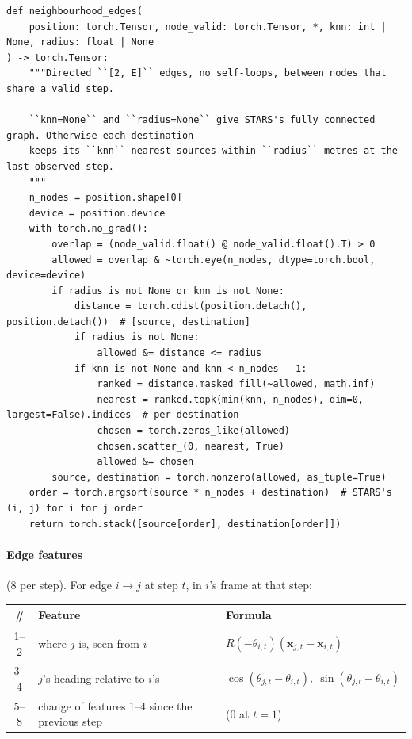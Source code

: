 \documentclass[10pt]{article}
\begin{document}
\par\smallskip{}\par\nopagebreak
\begin{lstlisting}[aboveskip=2pt]
def neighbourhood_edges(
    position: torch.Tensor, node_valid: torch.Tensor, *, knn: int | None, radius: float | None
) -> torch.Tensor:
    """Directed ``[2, E]`` edges, no self-loops, between nodes that share a valid step.

    ``knn=None`` and ``radius=None`` give STARS's fully connected graph. Otherwise each destination
    keeps its ``knn`` nearest sources within ``radius`` metres at the last observed step.
    """
    n_nodes = position.shape[0]
    device = position.device
    with torch.no_grad():
        overlap = (node_valid.float() @ node_valid.float().T) > 0
        allowed = overlap & ~torch.eye(n_nodes, dtype=torch.bool, device=device)
        if radius is not None or knn is not None:
            distance = torch.cdist(position.detach(), position.detach())  # [source, destination]
            if radius is not None:
                allowed &= distance <= radius
            if knn is not None and knn < n_nodes - 1:
                ranked = distance.masked_fill(~allowed, math.inf)
                nearest = ranked.topk(min(knn, n_nodes), dim=0, largest=False).indices  # per destination
                chosen = torch.zeros_like(allowed)
                chosen.scatter_(0, nearest, True)
                allowed &= chosen
        source, destination = torch.nonzero(allowed, as_tuple=True)
    order = torch.argsort(source * n_nodes + destination)  # STARS's (i, j) for i for j order
    return torch.stack([source[order], destination[order]])

\end{lstlisting}

\paragraph{Edge features} (8 per step). For edge $i\to j$ at step $t$, in $i$'s frame at that step:

\begin{center}\small
\begin{tabular}{@{}cll@{}}
\toprule
\# & Feature & Formula \\
\midrule
1--2 & where $j$ is, seen from $i$ & $R(-\theta_{i,t})(\mathbf x_{j,t}-\mathbf x_{i,t})$ \\
3--4 & $j$'s heading relative to $i$'s & $\cos(\theta_{j,t}-\theta_{i,t}),\ \sin(\theta_{j,t}-\theta_{i,t})$ \\
5--8 & change of features 1--4 since the previous step & (0 at $t=1$) \\
\bottomrule
\end{tabular}
\end{center}
\end{document}
